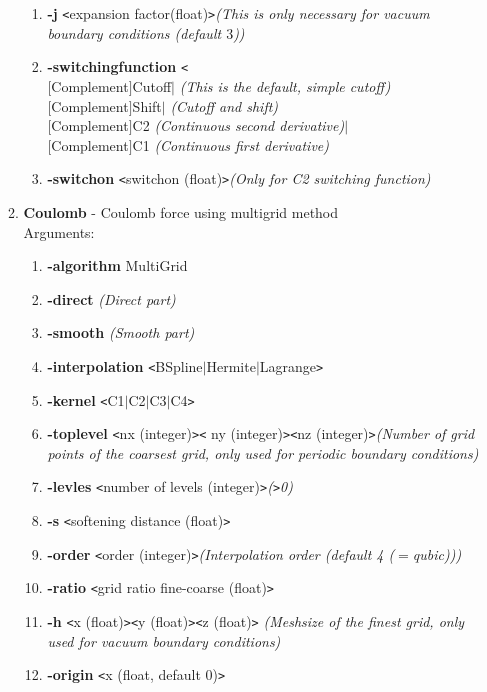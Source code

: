\documentclass[11pt]{report}
\newcommand{\tempstart}{\texttt{<}}
\newcommand{\tempend}{\texttt{>}}
\begin{document}
\begin{enumerate}
\begin{enumerate}
\begin{enumerate}
    \item {\bf -j} \tempstart expansion factor(float)\tempend   {\it (This is only necessary for vacuum boundary conditions (default $3$))}
    \item {\bf -switchingfunction} \tempstart \\
      $[$Complement$]$Cutoff$|$ {\it (This is the default, simple cutoff)}\\
      $[$Complement$]$Shift$|$ {\it (Cutoff and shift)} \\
      $[$Complement$]$C2 {\it (Continuous second derivative)}$|$\\
      $[$Complement$]$C1 {\it (Continuous first derivative)}
    \item {\bf -switchon} \tempstart switchon (float)\tempend  {\it (Only for C2 switching function)}
    \end{enumerate}
\newpage
  \item {\bf Coulomb} - Coulomb force using multigrid method\\
    Arguments:
    \begin{enumerate}
    \item {\bf -algorithm} MultiGrid
    \item {\bf -direct} {\it (Direct part)}
    \item {\bf -smooth} {\it (Smooth part)}
    \item {\bf -interpolation } \tempstart BSpline$|$Hermite$|$Lagrange\tempend 
    \item {\bf -kernel } \tempstart C1$|$C2$|$C3$|$C4\tempend 
    \item {\bf -toplevel} \tempstart nx (integer)\tempend   \tempstart
ny (integer)\tempend  \tempstart nz (integer)\tempend  {\it (Number of
grid points of the coarsest grid, only used for periodic boundary conditions)}
    \item  {\bf -levles} \tempstart number of levels (integer)\tempend   {\it (\tempend  0)}
    \item {\bf -s} \tempstart softening distance (float)\tempend 
    \item {\bf -order} \tempstart order (integer)\tempend  {\it (Interpolation order (default 4 ($=$qubic)))}
    \item {\bf -ratio} \tempstart grid ratio  fine-coarse (float)\tempend        
    \item {\bf -h} \tempstart x (float)\tempend   \tempstart y (float)\tempend  \tempstart z (float)\tempend 
      {\it (Meshsize of the finest grid, only used for vacuum boundary conditions)}
    \item  {\bf -origin} \tempstart x (float, default 0)\tempend

\end{enumerate}
\end{enumerate}
\end{enumerate}
\end{document}

